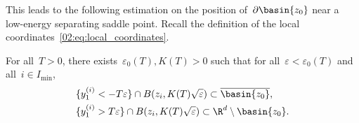             This leads to the following estimation on the position of~$\partial \basin{z_0}$ near a low-energy separating saddle point. Recall the definition of the local coordinates~\eqref{02:eq:local_coordinates}.
            \begin{lemma}
                \label{02:lemma:stable_manifold}
                For all~$T>0$, there exists~$\varepsilon_0(T),K(T)>0$ such that for all~$\varepsilon<\varepsilon_0(T)$ and all~$i\in I_{\min}$,
                \begin{equation}
                    \label{02:eq:basin_local_geometry}
                    \begin{aligned}
                        &\{y_1^{(i)} < -T\varepsilon\} \cap B(z_i,K(T)\sqrt{\varepsilon}) \subset \overline{\basin{z_0}},\\
                        &\{y_1^{(i)} > T\varepsilon\} \cap B(z_i,K(T)\sqrt{\varepsilon}) \subset \R^d \setminus \basin{z_0}.
                    \end{aligned}
                \end{equation}
            \end{lemma}
